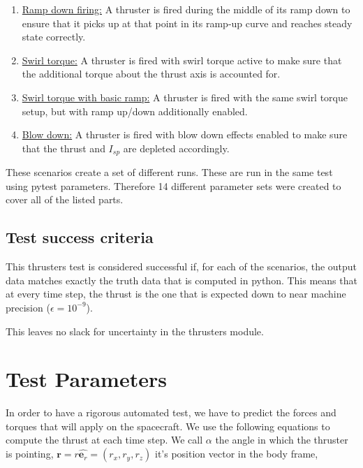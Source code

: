 \begin{enumerate}
\item{\underline{Ramp down firing:} A thruster is fired during the middle of its ramp down
   to ensure that it picks up at that point in its ramp-up curve and reaches
   steady state correctly.}
\item{\underline{Swirl torque:} A thruster is fired with swirl torque active to make sure that the additional torque about the thrust axis is accounted for.}
\item{\underline{Swirl torque with basic ramp:} A thruster is fired with the same swirl torque setup, but with ramp up/down additionally enabled.}
\item{\underline{Blow down:} A thruster is fired with blow down effects enabled to make sure that the thrust and $I_{sp}$ are depleted accordingly.}
\end{enumerate}

These scenarios create a set of different runs. These are run in the same test using pytest parameters. Therefore 14 different parameter sets were created to cover all of the listed parts.

\subsection{Test success criteria}

This thrusters test is considered successful if, for each of the scenarios, the output data matches exactly the truth data that is computed in python. This means that at every time step, the thrust is the one that is expected down to near machine precision ($\epsilon = 10^{-9}$).

This leaves no slack for uncertainty in the thrusters module.



\section{Test Parameters}


In order to have a rigorous automated test, we have to predict the forces and torques that will apply on the spacecraft. We use the following equations to compute the thrust at each time step. We call $\alpha$ the angle in which the thruster is pointing, $\bm r = r \hat{\bm e_r}= \left(r_x, r_y, r_z \right)$ it's position vector in the body frame,

